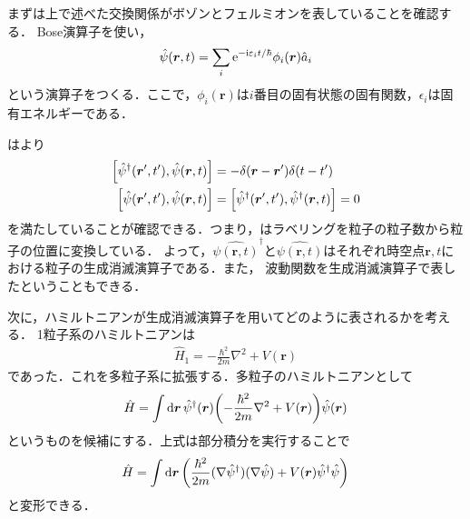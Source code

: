 \documentclass{report}
\begin{document}
まずは上で述べた交換関係がボゾンとフェルミオンを表していることを確認する．
Bose演算子を使い，
\begin{align}
  \hat{\psi}(\bm{r},t) = \sum_i \mathrm{e}^{-\mathrm{i}\varepsilon_i t/\hbar} \phi_i(\bm{r})\hat{a}_i \label{boson-field}
\end{align}
という演算子をつくる．ここで，$\phi_i(\bm{r})$は$i$番目の固有状態の固有関数，$\epsilon_i$は固有エネルギーである．

はより
\begin{align}
  \qty[\hat{\psi}^\dagger(\bm{r}',t'),\hat{\psi}(\bm{r},t)] &= -\delta(\bm{r} - \bm{r}')\delta(t - t')\\
  \qty[\hat{\psi}(\bm{r}',t'),\hat{\psi}(\bm{r},t)] &= \qty[\hat{\psi}^{\dagger}(\bm{r}',t'),\hat{\psi}^{\dagger}(\bm{r},t)] = 0
\end{align}
を満たしていることが確認できる．つまり，はラベリングを粒子の粒子数から粒子の位置に変換している．
よって，$\hat{\psi(\bm{r},t)}^{\dagger}$と$\hat{\psi(\bm{r},t)}$はそれぞれ時空点$\bm{r},t$における粒子の生成消滅演算子である．また，
波動関数を生成消滅演算子で表したということもできる．

次に，ハミルトニアンが生成消滅演算子を用いてどのように表されるかを考える．
1粒子系のハミルトニアンは
\begin{align}
  \hat{H}_1 = -\frac{\hbar^2}{2m}\nabla^2 + V(\bm{r})
\end{align}
であった．これを多粒子系に拡張する．多粒子のハミルトニアンとして
\begin{align}
  \hat{H} = \int \dd{\bm{r}} \hat{\psi}^{\dagger}(\bm{r}) \qty(-\frac{\hbar^2}{2m}\nabla^2 + V(\bm{r}))\hat{\psi}(\bm{r}) \label{hamiltonian-many1}
\end{align}
というものを候補にする．上式は部分積分を実行することで
\begin{align}
  \hat{H} = \int \dd{\bm{r}} \qty(\frac{\hbar^2}{2m}(\nabla\hat{\psi}^{\dagger})(\nabla\hat{\psi}) + V(\bm{r})\hat{\psi}^{\dagger}\hat{\psi}) \label{hamiltonian-many2}
\end{align}
と変形できる．
\end{document}
